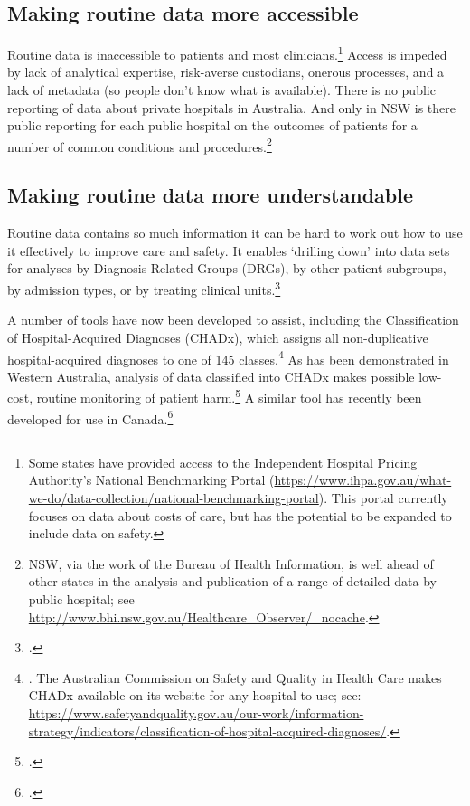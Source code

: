 \documentclass[FrontPage]{grattan}
\begin{document}
\subsection{Making routine data more accessible}\label{subsec:access}
Routine data is inaccessible to patients and most clinicians.\footnote{Some states have provided access to the Independent Hospital Pricing Authority’s National Benchmarking Portal (\textcolor{blue}{\url{https://www.ihpa.gov.au/what-we-do/data-collection/national-benchmarking-portal}}). This portal currently focuses on data about costs of care, but has the potential to be expanded to include data on safety.} Access is impeded by lack of analytical expertise, risk-averse custodians, onerous processes, and a lack of metadata (so people don’t know what is available). There is no public reporting of data about private hospitals in Australia. 
And only in NSW is there public reporting for each public hospital on the outcomes of patients for a number of common conditions and procedures.\footnote{NSW, via the work of the Bureau of Health Information, is well ahead of other states in the analysis and publication of a range of detailed data by public hospital; see \textcolor{blue}{\url{http://www.bhi.nsw.gov.au/Healthcare_Observer/_nocache}}.}



\subsection{Making routine data more understandable}\label{subsec:understand}
Routine data contains so much information it can be hard to work out how to use it effectively to improve care and safety. It enables ‘drilling down’ into data sets for analyses by Diagnosis Related Groups (DRGs), by other patient subgroups, by admission types, or by treating clinical units.\footcites{RN25}{RN24}

A number of tools have now been developed to assist, including the Classification of Hospital-Acquired Diagnoses (CHADx), which assigns all non-duplicative hospital-acquired diagnoses to one of 145 classes.\footnote{\textcite{jackson2009classification}. The Australian Commission on Safety and Quality in Health Care makes CHADx available on its website for any hospital to use; see: \textcolor{blue}{\url{https://www.safetyandquality.gov.au/our-work/information-strategy/indicators/classification-of-hospital-acquired-diagnoses/}}.}
As has been demonstrated in Western Australia, analysis of data classified into CHADx makes possible low-cost, routine monitoring of patient harm.\footcite{trentino2013measuring}
A similar tool has recently been developed for use in Canada.\footcite{RN26} 
\end{document}
